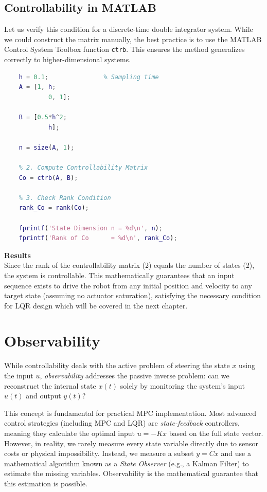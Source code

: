 \subsection{Controllability in MATLAB}

Let us verify this condition for a discrete-time double integrator system. While we could construct the matrix manually, the best practice is to use the MATLAB Control System Toolbox function \texttt{ctrb}. This ensures the method generalizes correctly to higher-dimensional systems.

\begin{lstlisting}[language=Matlab, caption={MATLAB script to check controllability using the \texttt{ctrb} command.}, label={lst:matlab_controllability}]
	% 1. Define the discrete-time double integrator
	h = 0.1;               % Sampling time
	A = [1, h; 
			0, 1];            
	
	B = [0.5*h^2; 
			h];               
	
	n = size(A, 1);        
	
	% 2. Compute Controllability Matrix
	Co = ctrb(A, B);
	
	% 3. Check Rank Condition
	rank_Co = rank(Co);
	
	fprintf('State Dimension n = %d\n', n);
	fprintf('Rank of Co      = %d\n', rank_Co);

\end{lstlisting}

\textbf{Results}\\

Since the rank of the controllability matrix (2) equals the number of states (2), the system is controllable. This mathematically guarantees that an input sequence exists to drive the robot from any initial position and velocity to any target state (assuming no actuator saturation), satisfying the necessary condition for LQR design which will be covered in the next chapter.

\section{Observability}

While controllability deals with the active problem of steering the state $x$ using the input $u$, \emph{observability} addresses the passive inverse problem: can we reconstruct the internal state $x(t)$ solely by monitoring the system's input $u(t)$ and output $y(t)$?

This concept is fundamental for practical MPC implementation. Most advanced control strategies (including MPC and LQR) are \textit{state-feedback} controllers, meaning they calculate the optimal input $u = -Kx$ based on the full state vector. However, in reality, we rarely measure every state variable directly due to sensor costs or physical impossibility. Instead, we measure a subset $y = Cx$ and use a mathematical algorithm known as a \textit{State Observer} (e.g., a Kalman Filter) to estimate the missing variables. Observability is the mathematical guarantee that this estimation is possible.

